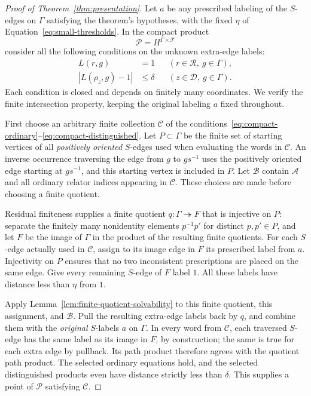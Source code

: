 \begin{proof}[Proof of Theorem~\ref{thm:presentation}]
Let $a$ be any prescribed labeling of the $S$-edges on $\Gamma$ satisfying
the theorem's hypotheses, with the fixed $\eta$ of
Equation~\eqref{eq:small-thresholds}.  In the compact product
\[
 \mathscr P=H^{\Gamma\times\mathcal T}
\]
consider all the following conditions on the unknown extra-edge labels:
\begin{align}
 L(r,g)&=1 &&(r\in\mathcal R,\ g\in\Gamma),
                           \label{eq:compact-ordinary}\\
 |L(\rho_z,g)-1|&\le\delta
             &&(z\in\mathcal D,\ g\in\Gamma).
                           \label{eq:compact-distinguished}
\end{align}
Each condition is closed and depends on finitely many coordinates.
We verify the finite intersection property, keeping the original
labeling $a$ fixed throughout.

First choose an arbitrary finite collection $\mathscr C$ of the
conditions~\eqref{eq:compact-ordinary}--\eqref{eq:compact-distinguished}.
Let $P\subset\Gamma$ be the finite set of starting vertices of all
\emph{positively oriented} $S$-edges used when evaluating the words
in $\mathscr C$.  An inverse occurrence traversing the edge from
$g$ to $gs^{-1}$ uses the positively oriented edge starting at
$gs^{-1}$, and this starting vertex is included in $P$.
Let $\mathcal B$ contain $\mathcal A$ and all ordinary relator indices
appearing in $\mathscr C$.  These choices are made before choosing a
finite quotient.

Residual finiteness supplies a finite quotient
$q:\Gamma\twoheadrightarrow F$ that is injective on $P$:
separate the finitely many nonidentity elements $p^{-1}p'$ for distinct
$p,p'\in P$, and let $F$ be the image of $\Gamma$ in the product
of the resulting finite quotients.
For each $S$-edge actually used in $\mathscr C$, assign to its image
edge in $F$ its prescribed label from $a$.  Injectivity on $P$ ensures
that no two inconsistent prescriptions are placed on the same edge.
Give every remaining $S$-edge of $F$ label $1$.  All these labels have
distance less than $\eta$ from $1$.

Apply Lemma~\ref{lem:finite-quotient-solvability} to this finite quotient,
this assignment, and $\mathcal B$.  Pull the resulting extra-edge labels
back by $q$, and combine them with the \emph{original} $S$-labels $a$
on $\Gamma$.  In every word from $\mathscr C$, each traversed $S$-edge
has the same label as its image in $F$, by construction; the same is
true for each extra edge by pullback.  Its path product therefore
agrees with the quotient path product.  The selected ordinary equations
hold, and the selected distinguished products even have distance
strictly less than $\delta$.  This supplies a point of $\mathscr P$
satisfying $\mathscr C$.


\end{proof}
